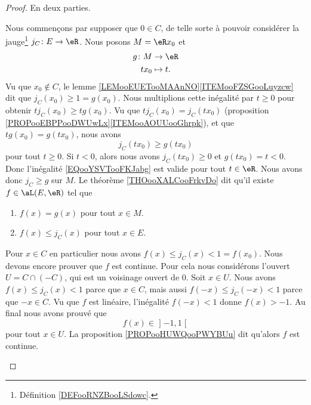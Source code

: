 \begin{proof}
	En deux parties.
	\begin{subproof}
		\spitem[Si \( 0\in C\)]
		Nous commençons par supposer que \( 0\in C\), de telle sorte à pouvoir considérer la jauge\footnote{Définition \ref{DEFooRNZBooLSdowc}.} \(j_C \colon E\to \eR  \). Nous posons \( M=\eR x_0\) et
		\begin{equation}
			\begin{aligned}
				g\colon M & \to \eR    \\
				tx_0      & \mapsto t.
			\end{aligned}
		\end{equation}
		Vu que \( x_0\not\in C\), le lemme \ref{LEMooEUETooMAAnNO}\ref{ITEMooFZSGooLuyzcw} dit que \( j_C(x_0)\geq 1=g(x_0)\). Nous multiplions cette inégalité par \( t\geq 0\) pour obtenir \( tj_C(x_0)\geq tg(x_0)\). Vu que \( tj_C(x_0)=j_C(tx_0)\) (proposition \ref{PROPooEBPPooDWUwLx}\ref{ITEMooAOUUooGhrpk}), et que \( tg(x_0)=g(tx_0)\), nous avons
		\begin{equation}		\label{EQooYSVTooFKJabg}
			j_C(tx_0)\geq g(tx_0)
		\end{equation}
		pour tout \( t\geq 0\). Si \( t<0\), alors nous avons \( j_C(tx_0)\geq 0\) et \( g(tx_0)=t<0\). Donc l'inégalité \eqref{EQooYSVTooFKJabg} est valide pour tout \( t\in \eR\). Nous avons donc \( j_C\geq g\) sur \( M\). Le théorème \ref{THOooXALCooFrkvDo} dit qu'il existe \( f\in \aL(E,\eR)\) tel que
		\begin{enumerate}
			\item
			      \( f(x)=g(x)\) pour tout \( x\in M\).
			\item
			      \( f(x)\leq j_C(x)\) pour tout \( x\in E\).
		\end{enumerate}
		Pour \( x\in C\) en particulier nous avons \( f(x)\leq j_C(x)<1=f(x_0)\). Nous devons encore prouver que \( f\) est continue. Pour cela nous considérons l'ouvert \( U=C\cap (-C)\), qui est un voisinage ouvert de \( 0\). Soit \( x\in U\). Nous avons \( f(x)\leq j_C(x)<1\) parce que \( x\in C\), mais aussi \( f(-x)\leq j_C(-x)<1\) parce que \( -x\in C\). Vu que \( f\) est linéaire, l'inégalité \( f(-x)<1\) donne \( f(x)>-1\). Au final nous avons prouvé que
		\begin{equation}
			f(x)\in \mathopen] -1,1\mathclose[
		\end{equation}
		pour tout \( x\in U\). La proposition \ref{PROPooHUWQooPWYBUu} dit qu'alors \( f\) est continue.


\end{subproof}
\end{proof}
